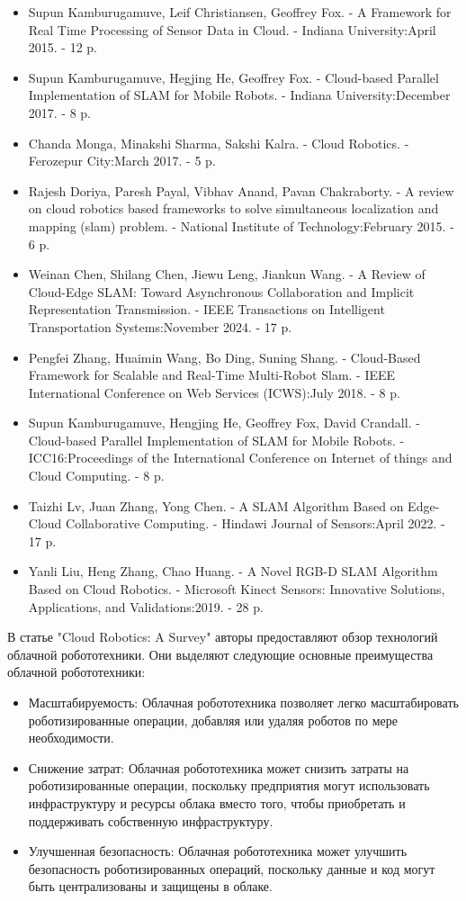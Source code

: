 \documentclass[a4paper, 14pt]{extreport}
\begin{document}
\begin{itemize}
        \item Supun Kamburugamuve, Leif Christiansen, Geoffrey Fox. - A Framework for Real Time Processing of Sensor Data in Cloud. - Indiana University:April 2015. - 12 p.
        \item Supun Kamburugamuve, Hegjing He, Geoffrey Fox. - Cloud-based Parallel \linebreak Implementation of SLAM for Mobile Robots. - Indiana University:December 2017. - 8 p.
        \item Chanda Monga, Minakshi Sharma, Sakshi Kalra. - Cloud Robotics. - Ferozepur City:March 2017. - 5 p.
        \item Rajesh Doriya, Paresh Payal, Vibhav Anand, Pavan Chakraborty. - A review on cloud robotics based frameworks to solve simultaneous localization and mapping (slam) problem. - National Institute of Technology:February 2015. - 6 p.
        \item Weinan Chen, Shilang Chen, Jiewu Leng, Jiankun Wang. - A Review of Cloud-Edge SLAM: Toward Asynchronous Collaboration and Implicit Representation Transmission. - IEEE Transactions on Intelligent Transportation Systems:November 2024. - 17 p. 
        \item Pengfei Zhang, Huaimin Wang, Bo Ding, Suning Shang. - Cloud-Based Framework for Scalable and Real-Time Multi-Robot Slam. - IEEE International Conference on Web Services (ICWS):July 2018. - 8 p.
        \item Supun Kamburugamuve, Hengjing He, Geoffrey Fox, David Crandall. - Cloud-based Parallel Implementation of SLAM for Mobile Robots. - ICC16:Proceedings of the International Conference on Internet of things and Cloud Computing. - 8 p.
        \item Taizhi Lv, Juan Zhang, Yong Chen. - A SLAM Algorithm Based on Edge-Cloud Collaborative Computing. - Hindawi Journal of Sensors:April 2022. - 17 p.
        \item Yanli Liu, Heng Zhang, Chao Huang. - A Novel RGB-D SLAM Algorithm Based on Cloud Robotics. - Microsoft Kinect Sensors: Innovative Solutions, Applications, and Validations:2019. - 28 p.
\end{itemize}
\par\noindent В статье "Cloud Robotics: A Survey" авторы предоставляют обзор технологий облачной робототехники. Они выделяют следующие основные преимущества облачной робототехники:
\begin{itemize}
        \item Масштабируемость: Облачная робототехника позволяет легко масштабировать роботизированные операции, добавляя или удаляя роботов по мере необходимости.
        \item Снижение затрат: Облачная робототехника может снизить затраты на роботизированные операции, поскольку предприятия могут использовать инфраструктуру и ресурсы облака вместо того, чтобы приобретать и поддерживать собственную инфраструктуру.
        \item Улучшенная безопасность: Облачная робототехника может улучшить безопасность роботизированных операций, поскольку данные и код могут быть централизованы и защищены в облаке.
\end{itemize}
\end{document}
